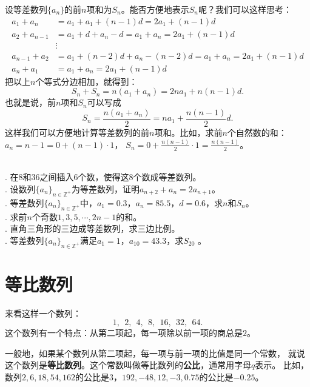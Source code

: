\documentclass[12pt,UTF8]{ctexbook}
\begin{document}
设等差数列$\{a_n\}$的前$n$项和为$S_n$。能否方便地表示$S_n$呢？我们可以这样思考：
\begin{align*}
a_{1} + a_{n} &= a_1 + a_1 + (n-1)d = 2a_1 + (n-1)d  \\
a_{2} + a_{n-1} &= a_1 + d + a_n - d = a_1 + a_n = 2a_1 + (n-1)d  \\
&\vdots  \\
a_{n-1} + a_{2} &= a_1 + (n-2)d + a_n - (n-2)d = a_1 + a_n =  2a_1 + (n-1)d  \\
a_{n} + a_{1} &= a_1 + a_n = 2a_1 + (n-1)d  
\end{align*}
把以上$n$个等式分边相加，就得到：
$$ S_n + S_n = n(a_1 + a_n) = 2na_1 + n(n-1)d. $$
也就是说，前$n$项和$S_n$可以写成
$$ S_n = \frac{n(a_1 + a_n)}{2} = na_1 + \frac{n(n-1)}{2}d. $$
这样我们可以方便地计算等差数列的前$n$项和。比如，求前$n$个自然数的和：$a_n = n-1 = 0 + (n-1)\cdot 1$，
$S_n = 0 + \frac{n(n-1)}{2}\cdot 1 = \frac{n(n-1)}{2}$。

\begin{xt}
    \mbox{} \\
    . 在$8$和$36$之间插入$6$个数，使得这$8$个数成等差数列。\\
    . 设数列$\{a_n\}_{n\in\mathbb{Z}^+}$为等差数列，证明$a_{n+2} + a_n = 2a_{n+1}$。\\
    . 等差数列$\{a_n\}_{n\in\mathbb{Z}^+}$中，$a_1 = 0.3$，$a_n = 85.5$，$d = 0.6$，求$n$和$S_n$。\\
    . 求前$n$个奇数$1,3,5,\cdots, 2n-1$的和。\\
    . 直角三角形的三边成等差数列，求三边比例。\\
    . 等差数列$\{a_n\}_{n\in\mathbb{Z}^+}$满足$a_1 = 1$，$a_{10}=43.3$，求$S_{20}$ 。    
\end{xt}

\section{等比数列}

来看这样一个数列：
$$ 1,\;\,2,\;\,4,\;\,8,\;\,16,\;\,32,\;\,64. $$
这个数列有一个特点：从第二项起，每一项除以前一项的商总是$2$。

一般地，如果某个数列从第二项起，每一项与前一项的比值是同一个常数，
就说这个数列是\textbf{等比数列}。这个常数叫做等比数列的\textbf{公比}，通常用字母$q$表示。
比如，数列$2,6,18,54,162$的公比是$3$，$192,-48,12,-3,0.75$的公比是$-0.25$。
\end{document}
